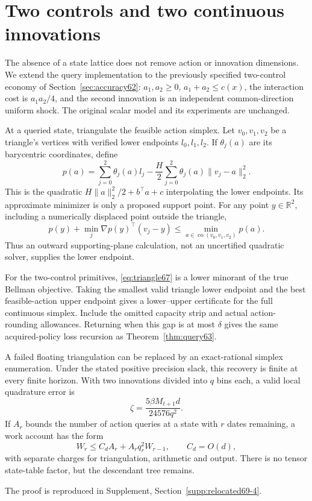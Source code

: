 \section{Two controls and two continuous innovations}\label{sec:vector67}
The absence of a state lattice does not remove action or innovation dimensions. We extend the query implementation to the previously specified two-control economy of Section~\ref{sec:accuracy62}: $a_1,a_2\ge0$, $a_1+a_2\le c(x)$, the interaction cost is $a_1a_2/4$, and the second innovation is an independent common-direction uniform shock. The original scalar model and its experiments are unchanged.

At a queried state, triangulate the feasible action simplex. Let $v_0,v_1,v_2$ be a triangle's vertices with verified lower endpoints $l_0,l_1,l_2$. If $\theta_j(a)$ are its barycentric coordinates, define
\begin{equation}\label{eq:triangle67}
 p(a)=\sum_{j=0}^2\theta_j(a)l_j
       -\frac H2\sum_{j=0}^2\theta_j(a)\|v_j-a\|_2^2.
\end{equation}
This is the quadratic $H\|a\|_2^2/2+b^\top a+c$ interpolating the lower endpoints. Its approximate minimizer is only a proposed support point. For any point $y\in\mathbb R^2$, including a numerically displaced point outside the triangle,
\begin{equation}\label{eq:dual-triangle67}
 p(y)+\min_j\nabla p(y)^\top(v_j-y)
                    \le \min_{a\in\operatorname{co}(v_0,v_1,v_2)}p(a).
\end{equation}
Thus an outward supporting-plane calculation, not an uncertified quadratic solver, supplies the lower endpoint.

\begin{theorem}\label{thm:vector67}
For the two-control primitives, \eqref{eq:triangle67} is a lower minorant of the true Bellman objective. Taking the smallest valid triangle lower endpoint and the best feasible-action upper endpoint gives a lower--upper certificate for the full continuous simplex. Include the omitted capacity strip and actual action-rounding allowances. Returning when this gap is at most $\delta$ gives the same acquired-policy loss recursion as Theorem~\ref{thm:query63}.

A failed floating triangulation can be replaced by an exact-rational simplex enumeration. Under the stated positive precision slack, this recovery is finite at every finite horizon. With two innovations divided into $q$ bins each, a valid local quadrature error is
\begin{equation}\label{eq:two-shock67}
 \zeta=\frac{5\beta M_{t+1}d}{24576q^2}.
\end{equation}
If $A_r$ bounds the number of action queries at a state with $r$ dates remaining, a work account has the form
\begin{equation}\label{eq:vector-work67}
 W_r\le C_d A_r+A_rq_r^2W_{r-1},\qquad C_d=O(d),
\end{equation}
with separate charges for triangulation, arithmetic and output. There is no tensor state-table factor, but the descendant tree remains.
\end{theorem}
\noindent The proof is reproduced in Supplement, Section~\ref{supp:relocated69-4}.

